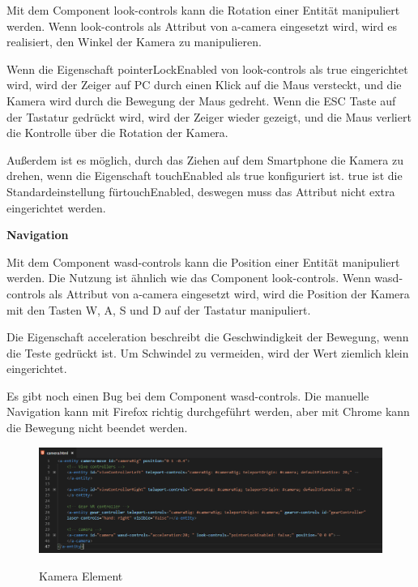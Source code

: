   Mit dem Component {\selectfont look-controls} kann die Rotation einer Entität manipuliert werden. Wenn {\selectfont look-controls} als Attribut von {\selectfont a-camera} eingesetzt wird, wird es realisiert, den Winkel der Kamera zu manipulieren.
  
  Wenn die Eigenschaft {\selectfont pointerLockEnabled} von {\selectfont look-controls}  als {\selectfont true} eingerichtet wird, wird der Zeiger auf PC durch einen Klick auf die Maus versteckt, und die Kamera wird durch die Bewegung der Maus gedreht. Wenn die ESC Taste auf der Tastatur gedrückt wird, wird der Zeiger wieder gezeigt, und die Maus verliert die Kontrolle über die Rotation der Kamera.
  
  Außerdem ist es möglich, durch das Ziehen auf dem Smartphone die Kamera zu drehen, wenn die Eigenschaft {\selectfont touchEnabled} als {\selectfont true} konfiguriert ist. {\selectfont true} ist die Standardeinstellung für{\selectfont touchEnabled}, deswegen muss das Attribut nicht extra eingerichtet werden.
  
  \textbf{Navigation}
  
  Mit dem Component {\selectfont wasd-controls} kann die Position einer Entität manipuliert werden. Die Nutzung ist ähnlich wie das Component {\selectfont look-controls}. Wenn {\selectfont wasd-controls} als Attribut von {\selectfont a-camera} eingesetzt wird, wird die Position der Kamera mit den Tasten W, A, S und D auf der Tastatur manipuliert.
  
  Die Eigenschaft {\selectfont acceleration} beschreibt die Geschwindigkeit der Bewegung, wenn die Teste gedrückt ist. Um Schwindel zu vermeiden, wird der Wert ziemlich klein eingerichtet.
  
  Es gibt noch einen Bug bei dem Component {\selectfont wasd-controls}. Die manuelle Navigation kann mit Firefox richtig durchgeführt werden, aber mit Chrome kann die Bewegung nicht beendet werden.
  
\begin{figure}[ht]
\vspace*{1em}
\centering
\caption[Kamera Element]{Kamera Element}
\includegraphics[width=\textwidth]{images/cameraHtml.png}
\label{fig:cameraHtml} 
\end{figure}
  
